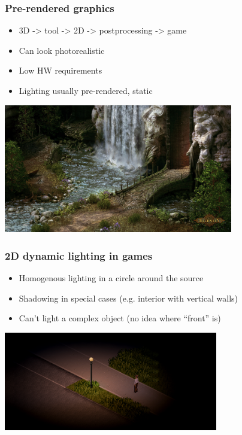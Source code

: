 \documentclass{beamer}
\begin{document}
\begin{frame}\frametitle{Pre-rendered graphics}

\begin{itemize}
\item
  3D -\textgreater{} tool -\textgreater{} 2D -\textgreater{}
  postprocessing -\textgreater{} game
\item
  Can look photorealistic
\item
  Low HW requirements
\item
  Lighting usually pre-rendered, static
\end{itemize}

\begin{center}
\includegraphics[width=0.75\textwidth]{eternity.jpg}
\end{center}

\end{frame}

\begin{frame}\frametitle{2D dynamic lighting in games}

\begin{itemize}
\item
  Homogenous lighting in a circle around the source
\item
  Shadowing in special cases (e.g. interior with vertical walls)
\item
  Can't light a complex object (no idea where ``front'' is)
\end{itemize}
\begin{center}
\includegraphics[width=0.7\textwidth]{2dlight.png}
\end{center}

\end{frame}
\end{document}
